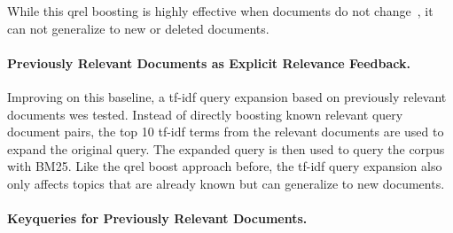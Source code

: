 While this qrel boosting is highly effective when documents do not change~\cite{alkhalifa:2024,keller:2024b}, it can not generalize to new or deleted documents.


\paragraph{Previously Relevant Documents as Explicit Relevance Feedback.} Improving on this baseline, a tf-idf query expansion based on previously relevant documents wes tested. Instead of directly boosting known relevant query document pairs, the top 10 tf-idf terms from the relevant documents are used to expand the original query. The expanded query is then used to query the corpus with BM25. Like the qrel boost approach before, the tf-idf query expansion also only affects topics that are already known but can generalize to new documents.


\paragraph{Keyqueries for Previously Relevant Documents.}

